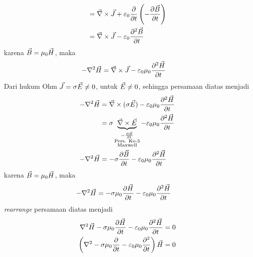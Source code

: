 \begin{itemize}
\begin{align*}
        &=\vec{\nabla} \times \vec{J} + \varepsilon_0\frac{\partial}{\partial t}\left(-\frac{\partial\vec{B}}{\partial t}\right)\\
        &=\vec{\nabla} \times \vec{J} - \varepsilon_0\frac{\partial^2\vec{B}}{\partial t}
    \end{align*}
    karena $\vec{B}=\mu_0 \vec{H}$, maka
    \begin{align*}
        -\nabla^2\vec{H}&=\vec{\nabla} \times \vec{J} - \varepsilon_0\mu_0\frac{\partial^2\vec{H}}{\partial t}
    \end{align*}
    Dari hukum Ohm $\vec{J}=\sigma \vec{E} \neq 0$, untuk $\vec{E}\neq 0$, sehingga persamaan diatas menjadi
    \begin{align*}
        -\nabla^2\vec{H}&=\vec{\nabla} \times (\sigma\vec{E}) - \varepsilon_0\mu_0\frac{\partial^2\vec{H}}{\partial t}\\
        &=\sigma \underbrace{\vec{\nabla} \times \vec{E}}_{\substack{-\frac{\partial \vec{B}}{\partial t} \\ \text{Pers. Ke-3} \\\text{Maxwell}}} - \varepsilon_0\mu_0\frac{\partial^2\vec{H}}{\partial t}\\
        -\nabla^2\vec{H}&=-\sigma \frac{\partial \vec{B}}{\partial t} - \varepsilon_0\mu_0\frac{\partial^2\vec{H}}{\partial t}
    \end{align*}
    karena $\vec{B}=\mu_0 \vec{H}$, maka
    \begin{align*}
        -\nabla^2\vec{H}&=-\sigma\mu_0 \frac{\partial \vec{H}}{\partial t} - \varepsilon_0\mu_0\frac{\partial^2\vec{H}}{\partial t}
    \end{align*}
    \textit{rearrange} persamaan diatas menjadi
    \begin{align*}
        \nabla^2\vec{H}-\sigma\mu_0 \frac{\partial \vec{H}}{\partial t} - \varepsilon_0\mu_0\frac{\partial^2\vec{H}}{\partial t}&=0\\
        \left(\nabla^2-\sigma\mu_0 \frac{\partial}{\partial t} - \varepsilon_0\mu_0\frac{\partial^2}{\partial t}\right)\vec{H}&=0\\
    \end{align*}
\end{itemize}